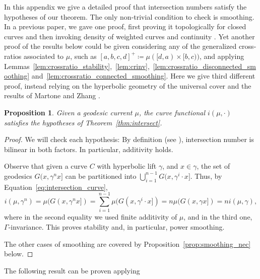 \documentclass[11pt]{amsart}
\numberwithin{equation}{section}
\numberwithin{figure}{section}
\newtheorem{proposition}[theorem]{Proposition}
\theoremstyle{definition}
\theoremstyle{plain}
\begin{document}
In this appendix we give a detailed proof that intersection numbers
satisfy the hypotheses of our theorem. The only non-trivial condition
to check is smoothing.
In a previous paper, we gave one proof, first proving it
topologically for closed curves and then invoking density of weighted
curves and continuity \cite[Example~4.2]{MGT21:Smoothings}. Yet another proof of the results below could be given considering any of the generalized cross-ratios associated to $\mu$, such as $[a,b,c,d]^+ \coloneqq \mu([d,a) \times [b,c))$, and applying Lemmas~\ref{lem:crossratio_stability},~\ref{lem:crinv},~\ref{lem:crossratio_disconnected_smoothing} and~\ref{lem:crossratio_connected_smoothing}. Here we
give third  different proof, instead relying
on the hyperbolic geometry of the universal cover and the results of Martone and Zhang
\cite{MZ19:PositivelyRatioed}.


\begin{proposition}
Given a geodesic current $\mu$, the curve functional $i(\mu, \cdot)$ satisfies the hypotheses of Theorem~\ref{thm:intersect}.
\label{prop:necessary}
\end{proposition}
\begin{proof}
We will check each hypothesis:
 By definition (see \cite{Bonahon86:EndsHyperbolicManifolds}), intersection number is bilinear in both factors. In particular, additivity holds.

 Observe that given a curve $C$ with hyperbolic lift
 $\gamma$, and $x \in \gamma$, the set of geodesics $G(x, \gamma^n x]$
 can be partitioned into $\bigcup_{i=1}^{n-1} G(x, \gamma^{i} \cdot
 x]$.  Thus, by Equation~\eqref{eq:intersection_curve},
\begin{equation}\label{eq:intersection-stability}
i(\mu, \gamma^n) = \mu(G(x, \gamma^n x]) = \sum_{i=1}^{n-1} \mu(G(x, \gamma^{i} \cdot x]) = n\mu(G(x, \gamma x]) = n i(\mu, \gamma),
\end{equation}
where in the second equality we used finite additivity of $\mu$, and
in the third one, $\Gamma$-invariance. This proves stability and, in
particular, power smoothing.

 The other cases of smoothing are covered by
 Proposition~\ref{prop:smoothing_nec} below.
\end{proof}


The following result can be proven applying 
\end{document}
